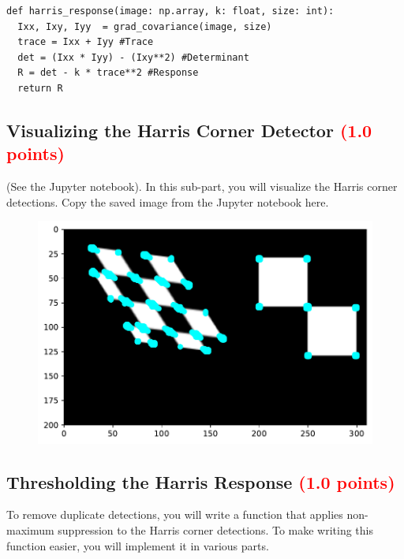 \documentclass[answers]{exam}
\newcommand{\mypoints}[1]{\textcolor{red}{(#1 points)}}
\begin{document}
\begin{solution}
\begin{verbatim}
def harris_response(image: np.array, k: float, size: int):
  Ixx, Ixy, Iyy  = grad_covariance(image, size)
  trace = Ixx + Iyy #Trace
  det = (Ixx * Iyy) - (Ixy**2) #Determinant
  R = det - k * trace**2 #Response
  return R
\end{verbatim}
\end{solution}

\subsection{Visualizing the Harris Corner Detector \mypoints{1.0}}
(See the Jupyter notebook). In this sub-part, you will visualize the Harris corner detections. Copy the saved image from the Jupyter notebook here.

\begin{solution}
\begin{figure}[H]
    \centering
    \includegraphics[width=\linewidth]{Images/question_3_5.pdf}
\end{figure}
\end{solution}

\subsection{Thresholding the Harris Response \mypoints{1.0}}
To remove duplicate detections, you will write a function that applies non-maximum suppression to the Harris corner detections. To make writing this function easier, you will implement it in various parts.
\end{document}
